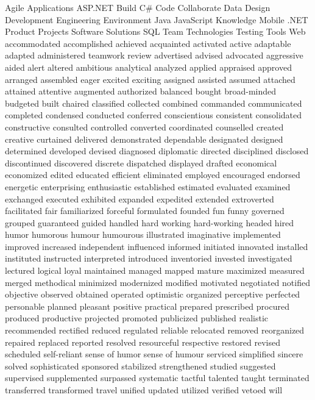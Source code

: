 \documentclass[]{friggeri-cv} %
\begin{document}
\keyword
{
Agile
Applications
ASP.NET
Build
C\#
Code
Collaborate
Data
Design
Development
Engineering
Environment
Java
JavaScript
Knowledge
Mobile
.NET
Product
Projects
Software
Solutions
SQL
Team
Technologies
Testing
Tools
Web
accommodated
accomplished
achieved
acquainted
activated
active
adaptable
adapted
administered
teamwork
review
advertised
advised
advocated
aggressive
aided
alert
altered
ambitious
analytical
analyzed
applied
appraised
approved
arranged
assembled
eager
excited
exciting
assigned
assisted
assumed
attached
attained
attentive
augmented
authorized
balanced
bought
broad-minded
budgeted
built
chaired
classified
collected
combined
commanded
communicated
completed
condensed
conducted
conferred
conscientious
consistent
consolidated
constructive
consulted
controlled
converted
coordinated
counselled
created
creative
curtained
delivered
demonstrated
dependable
designated
designed
determined
developed
devised
diagnosed
diplomatic
directed
disciplined
disclosed
discontinued
discovered
discrete
dispatched
displayed
drafted
economical
economized
edited
educated
efficient
eliminated
employed
encouraged
endorsed
energetic
enterprising
enthusiastic
established
estimated
evaluated
examined
exchanged
executed
exhibited
expanded
expedited
extended
extroverted
facilitated
fair
familiarized
forceful
formulated
founded
fun
funny
governed
grouped
guaranteed
guided
handled
hard working
hard-working
headed
hired
humor
humorous
humour
humourous
illustrated
imaginative
implemented
improved
increased
independent
influenced
informed
initiated
innovated
installed
instituted
instructed
interpreted
introduced
inventoried
invested
investigated
lectured
logical
loyal
maintained
managed
mapped
mature
maximized
measured
merged
methodical
minimized
modernized
modified
motivated
negotiated
notified
objective
observed
obtained
operated
optimistic
organized
perceptive
perfected
personable
planned
pleasant
positive
practical
prepared
prescribed
procured
produced
productive
projected
promoted
publicized
published
realistic
recommended
rectified
reduced
regulated
reliable
relocated
removed
reorganized
repaired
replaced
reported
resolved
resourceful
respective
restored
revised
scheduled
self-reliant
sense of humor
sense of humour
serviced
simplified
sincere
solved
sophisticated
sponsored
stabilized
strengthened
studied
suggested
supervised
supplemented
surpassed
systematic
tactful
talented
taught
terminated
transferred
transformed
travel
unified
updated
utilized
verified
vetoed
will
}

\newpage
\end{document}
